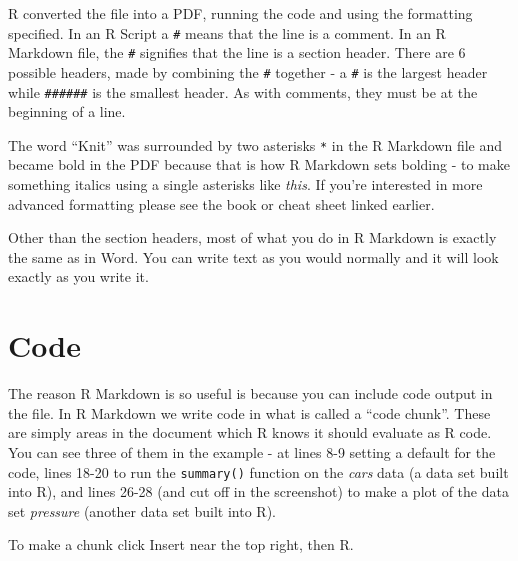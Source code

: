 \documentclass[
]{krantz}
\begin{document}
R converted the file into a PDF, running the code and using
the formatting specified. In an R Script a \texttt{\#} means
that the line is a comment. In an R Markdown file, the
\texttt{\#} signifies that the line is a section header.
There are 6 possible headers, made by combining the
\texttt{\#} together - a \texttt{\#} is the largest header
while \texttt{\#\#\#\#\#\#} is the smallest header. As with
comments, they must be at the beginning of a line.

The word ``Knit'' was surrounded by two asterisks \texttt{*}
in the R Markdown file and became bold in the PDF because
that is how R Markdown sets bolding - to make something
italics using a single asterisks like \emph{this}. If you're
interested in more advanced formatting please see the book
or cheat sheet linked earlier.

Other than the section headers, most of what you do in R
Markdown is exactly the same as in Word. You can write text
as you would normally and it will look exactly as you write
it.

\hypertarget{code-1}{%
\section{Code}\label{code-1}}

The reason R Markdown is so useful is because you can
include code output in the file. In R Markdown we write code
in what is called a ``code chunk''. These are simply areas
in the document which R knows it should evaluate as R code.
You can see three of them in the example - at lines 8-9
setting a default for the code, lines 18-20 to run the
\texttt{summary()} function on the \emph{cars} data (a data
set built into R), and lines 26-28 (and cut off in the
screenshot) to make a plot of the data set \emph{pressure}
(another data set built into R).

To make a chunk click Insert near the top right, then R.
\end{document}
